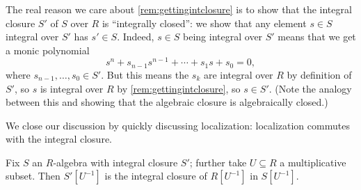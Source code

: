 \begin{remark}[Nir]
	The real reason we care about \autoref{rem:gettingintclosure} is to show that the integral closure $S'$ of $S$ over $R$ is ``integrally closed'': we show that any element $s\in S$ integral over $S'$ has $s'\in S$. Indeed, $s\in S$ being integral over $S'$ means that we get a monic polynomial
	\[s^n+s_{n-1}s^{n-1}+\cdots+s_1s+s_0=0,\]
	where $s_{n-1},\ldots,s_0\in S'$. But this means the $s_k$ are integral over $R$ by definition of $S'$, so $s$ is integral over $R$ by \autoref{rem:gettingintclosure}, so $s\in S'$. (Note the analogy between this and showing that the algebraic closure is algebraically closed.)
\end{remark}
We close our discussion by quickly discussing localization: localization commutes with the integral closure.
\begin{proposition}
	Fix $S$ an $R$-algebra with integral closure $S'$; further take $U\subseteq R$ a multiplicative subset. Then $S'\left[U^{-1}\right]$ is the integral closure of $R\left[U^{-1}\right]$ in $S\left[U^{-1}\right]$.
\end{proposition}

